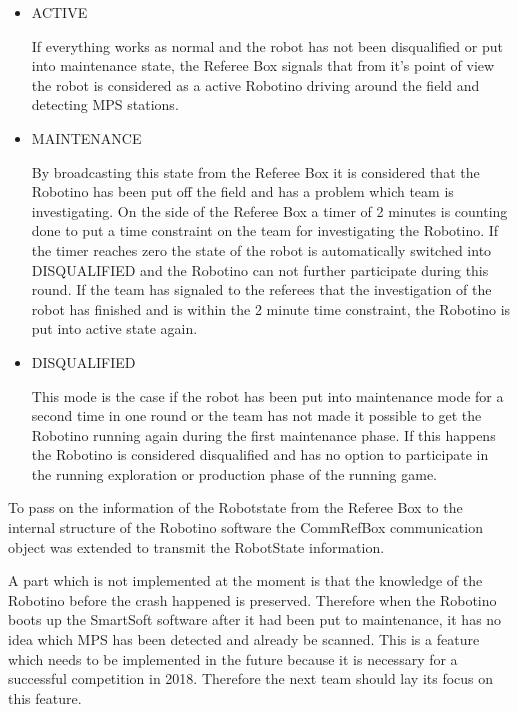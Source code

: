 \begin{itemize}

\item ACTIVE

If everything works as normal and the robot has not been disqualified or put into maintenance state, the Referee Box signals that from it's point of view the robot is considered as a active Robotino driving around the field and detecting MPS stations. 


\item MAINTENANCE

By broadcasting this state from the Referee Box it is considered that the Robotino has been put off the field and has a problem which team is investigating. On the side of the Referee Box a timer of 2 minutes is counting done to put a time constraint on the team for investigating the Robotino. If the timer reaches zero the state of the robot is automatically switched into DISQUALIFIED and the Robotino can not further participate during this round. If the team has signaled to the referees that the investigation of the robot has finished and is within the 2 minute time constraint, the Robotino is put into active state again. 

\item DISQUALIFIED

This mode is the case if the robot has been put into maintenance mode for a second time in one round or the team has not made it possible to get the Robotino running again during the first maintenance phase. If this happens the Robotino is considered disqualified and has no option to participate in the running exploration or production phase of the running game.  

\end{itemize}

To pass on the information of the Robotstate from the Referee Box to the internal structure of the Robotino software the CommRefBox communication object was extended to transmit the RobotState information. \\


\newpage

A part which is not implemented at the moment is that the knowledge of the Robotino before the crash happened is preserved. Therefore when the Robotino boots up the SmartSoft software after it had been put to maintenance, it has no idea which MPS has been detected and already be scanned. This is a feature which needs to be implemented in the future because it is necessary for a successful competition in 2018. Therefore the next team should lay its focus on this feature. \\


